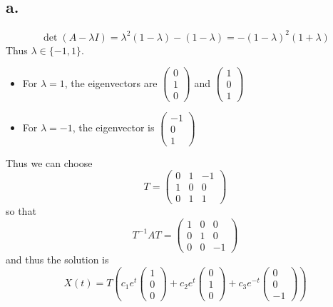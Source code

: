 \documentclass[11pt]{article}
\theoremstyle{mystyle}
\theoremstyle{definition}
\begin{document}
\subsection*{a.}
\[
  \det(A-\lambda I) = \lambda^2(1-\lambda) - (1-\lambda) = -(1-\lambda)^2(1+ \lambda)
\]
Thus $\lambda \in \{-1,1\}$. \\
\begin{itemize}
  \item For $\lambda = 1$, the eigenvectors are 
    $  
    \begin{pmatrix}
      0 \\ 1 \\ 0 
    \end{pmatrix}
    $ 
    and 
    $  
    \begin{pmatrix}
      1 \\ 0 \\ 1 
    \end{pmatrix}
    $ 
  \item For $\lambda = -1$, the eigenvector is
    $  
    \begin{pmatrix}
      -1 \\ 0 \\ 1 
    \end{pmatrix}
    $
\end{itemize}
Thus we can choose 
\[
  T = 
  \begin{pmatrix}
    0 & 1 & -1 \\
    1 & 0 & 0 \\
    0 & 1 & 1
  \end{pmatrix}
\]
so that 
\[
  T^{-1}AT = 
  \begin{pmatrix}
    1 & 0 & 0 \\
    0 & 1 & 0 \\
    0 & 0 & -1
  \end{pmatrix}
\]
and thus the solution is 
\[
  X(t) = T \left(
  c_1 e^t 
  \begin{pmatrix}
    1 \\ 0 \\ 0
  \end{pmatrix}
  + c_2 e^t 
  \begin{pmatrix}
    0 \\ 1 \\ 0
  \end{pmatrix}
  + c_3 e^{-t}
  \begin{pmatrix}
    0 \\ 0 \\ -1
  \end{pmatrix}
  \right)
\]
\end{document}
